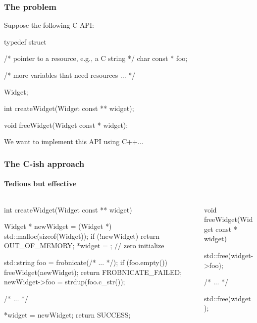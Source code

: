 \documentclass{beamer}
\begin{document}

\begin{frame}[fragile]
\frametitle{The problem}
Suppose the following C API:

\begin{C++}
typedef struct
{
    /* pointer to a resource, e.g., a C string */
    char const * foo;

    /* more variables that need resources ... */
    
} Widget;

int createWidget(Widget const ** widget);

void freeWidget(Widget const * widget);
\end{C++}

We want to implement this API using C++...
\end{frame}


\begin{frame}[fragile]
\frametitle{The C-ish approach}
\framesubtitle{Tedious but effective}
\begin{columns}
\begin{column}{0.45\textwidth}
\begin{TinyC++}
int createWidget(Widget const ** widget)
{
	Widget * newWidget = (Widget *) std::malloc(sizeof(Widget));
	if (!newWidget)
	{
		return OUT_OF_MEMORY;
	}
	*widget = {}; // zero initialize
    
	std::string	foo = frobnicate(/* ... */);
	if (foo.empty())
	{
		freeWidget(newWidget);
		return FROBNICATE_FAILED;
	}
	newWidget->foo = strdup(foo.c_str());
    
	/* ... */
    
	*widget = newWidget;
	return SUCCESS;
}
\end{TinyC++}
\end{column}
\begin{column}{0.45\textwidth}
\begin{TinyC++}
void freeWidget(Widget const * widget)
{
	std::free(widget->foo);
    
	/* ... */
    
	std::free(widget);
}
\end{TinyC++}
\end{column}
\end{columns}
\end{frame}
\end{document}
